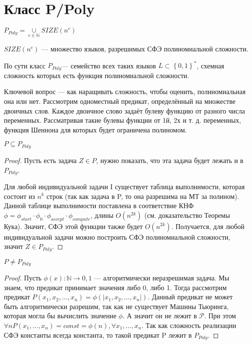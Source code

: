 \section{Класс P/Poly}

\begin{definition}
	$P_{Poly} = \cup\limits_{c\in \mathbb{N}} SIZE(n^c) $
\end{definition}
$SIZE(n^c)$ --- множество языков, разрешимых СФЭ полиномиальной сложности.

По сути класс $P_{Poly}$--- семейство всех таких языков $L \subset \left\{ 0,1
\right\}^* $, схемная сложность которых есть функция полиномиальной сложности.

Ключевой вопрос --- как наращивать сложность, чтобы оценить, полиномиальная она
или нет. Рассмотрим одноместный предикат, определённый на множестве двоичных
слов. Каждое двоичное слово задаёт булеву функцию от разного числа переменных.
Рассматривая такие булевы функции от 1й, 2х и т. д. переменных, функция Шеннона
для которых будет ограничена полиномом.


\begin{theorem}
	$P\subseteq P_{Poly}$
\end{theorem}
\begin{proof}
	Пусть есть задача $Z \in P$, нужно показать, что эта задача будет лежать
	и в  $P_{Poly}$.

	Для любой индивидуальной задачи I существует таблица выполнимости,
	которая состоит из  $n^k$ строк (так как задача в P, то она разрешима на
	МТ за полином). Данной таблице выполнимости поставлена в соответствие
	КНФ $\phi = \phi_{start}\cdot \phi_0 \cdot \phi_{accept} \cdot
	\phi_{compute}$, длины $O(n^{2k})$ (см. доказательство Теоремы Кука).
	Значит, СФЭ этой функции также будет
	$O(n^{2k})$. Получается, для любой индивидуальной задачи можно построить
	СФЭ полиномиальной сложности, значит $Z\in P_{Poly}$.
\end{proof}
\begin{theorem}
	$P \not = P_{Poly}$
\end{theorem}
\begin{proof}
	Пусть $\phi(x): \mathbb{N} \to {0, 1}$ --- алгоритмически неразрешимая
	задача. Мы знаем, что предикат принимает значения либо 0, либо 1. Тогда
	рассмотрим предикат $P(x_1, x_2,\ldots, x_n) = \phi(\left| x_1, x_2,
	\ldots, x_n \right| )$. Данный предикат не может быть алгоритмически
	разрешим, так как не существует Машины Тьюринга, которая могла бы
	вычислить значение $\phi$. А значит он не лежит в $\mathcal{P}$. При этом  $\forall n P(x_1, \ldots, x_n) =
	const = \phi (n), \forall x_1, \ldots, x_n$. Так как сложность
	реализации СФЭ константы всегда константа, то такой предикат P лежит в
	$P_{Poly}$.
\end{proof}

